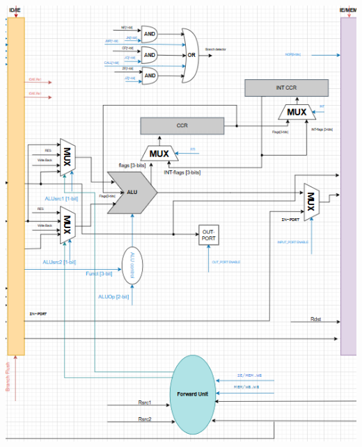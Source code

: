\documentclass{report}
\begin{document}
\begin{minipage}{0.35\textwidth}
\begin{center}
    \includegraphics[width=\textwidth]{./assets/EX.png}
\end{center}
\end{minipage}
\end{document}
